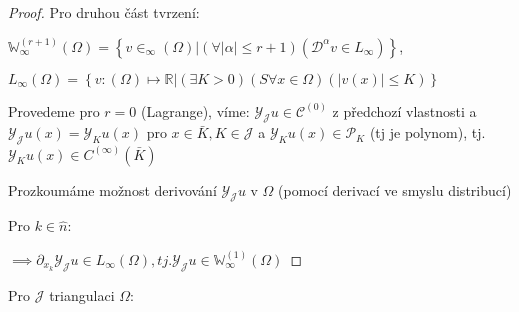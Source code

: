 \documentclass[../main.tex]{subfiles}
\begin{document}

\begin{proof}

    Pro druhou část tvrzení:

    $\mathbb{W}_\infty^{(r+1)}(\Omega) = \left\{v\in _\infty(\Omega)| (\forall |\alpha|\leq r+1)(\mathcal{D}^\alpha v \in L_\infty)\right\}$,

    $L_\infty(\Omega) = \left\{v: (\Omega)\mapsto \mathbb{R}| (\exists K > 0)(S\forall x \in \Omega)(|v(x)| \leq K) \right\} $

    Provedeme pro $r = 0$ (Lagrange), víme: $\mathcal{Y}_\mathcal{J} u \in \mathcal{C}^{(0)}$ z předchozí vlastnosti a $\mathcal{Y}_\mathcal{J} u (x) = \mathcal{Y}_K u(x)$ pro $x\in\bar{K}, K \in \mathcal{J}$  a $\mathcal{Y}_K u(x)\in \mathcal{P}_K$ (tj je polynom), tj. $\mathcal{Y}_K u(x)\in C^{(\infty)}(\bar{K})$

    Prozkoumáme možnost derivování $\mathcal{Y}_\mathcal{J} u$ v $\Omega$ (pomocí derivací ve smyslu  distribucí)

    Pro $k\in\hat{n}:$ 


    $\implies \partial_{x_k} \mathcal{Y}_\mathcal{J} u \in L_\infty(\Omega), tj. \mathcal{Y}_\mathcal{J} u \in \mathbb{W}_\infty^{(1)}(\Omega)$

\end{proof}


\begin{remark}
    Pro $\mathcal{J}$ triangulaci $\Omega $:
\end{remark}
\end{document}
